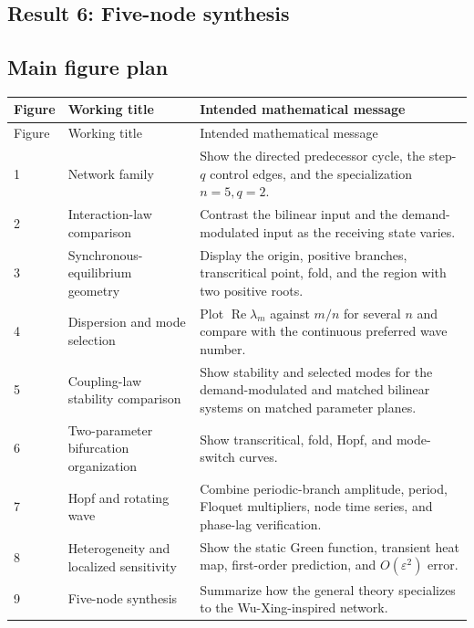 \documentclass[11pt, reqno]{amsart}
\theoremstyle{definition}
\theoremstyle{remark}
\newcommand{\eps}{\varepsilon}
\newcommand{\Ree}{\operatorname{Re}}
\begin{document}
	\subsection{Result 6: Five-node synthesis}
	
	
	\subsection{Main figure plan}
	
	\begin{longtable}{p{1.1cm}p{4.5cm}p{8.5cm}}
		\toprule
		Figure & Working title & Intended mathematical message \\
		\midrule
		\endfirsthead
		\toprule
		Figure & Working title & Intended mathematical message \\
		\midrule
		\endhead
		1 & Network family & Show the directed predecessor cycle, the step-$q$ control edges, and the specialization $n=5,q=2$. \\
		2 & Interaction-law comparison & Contrast the bilinear input and the demand-modulated input as the receiving state varies. \\
		3 & Synchronous-equilibrium geometry & Display the origin, positive branches, transcritical point, fold, and the region with two positive roots. \\
		4 & Dispersion and mode selection & Plot $\Ree\lambda_m$ against $m/n$ for several $n$ and compare with the continuous preferred wave number. \\
		5 & Coupling-law stability comparison & Show stability and selected modes for the demand-modulated and matched bilinear systems on matched parameter planes. \\
		6 & Two-parameter bifurcation organization & Show transcritical, fold, Hopf, and mode-switch curves. \\
		7 & Hopf and rotating wave & Combine periodic-branch amplitude, period, Floquet multipliers, node time series, and phase-lag verification. \\
		8 & Heterogeneity and localized sensitivity & Show the static Green function, transient heat map, first-order prediction, and $O(\eps^2)$ error. \\
		9 & Five-node synthesis & Summarize how the general theory specializes to the Wu-Xing-inspired network. \\
		\bottomrule
	\end{longtable}
	
\end{document}
